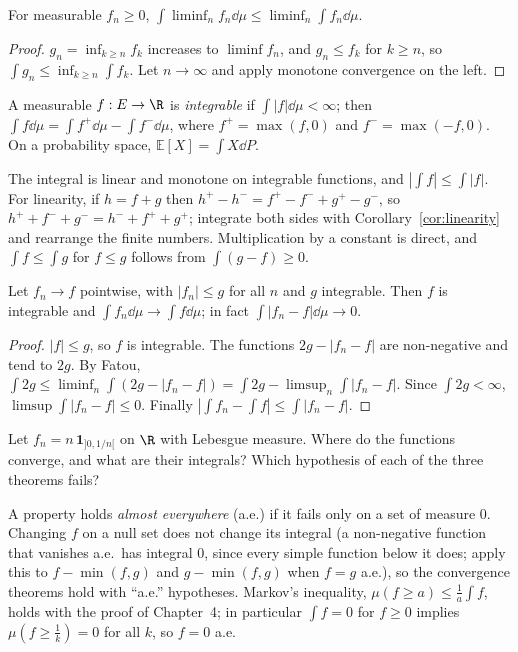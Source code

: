 \begin{theorem}\label{thm:fatou}
For measurable $f_n\ge0$, $\displaystyle\int\liminf_nf_n\dd\mu\le\liminf_n\int f_n\dd\mu$.
\end{theorem}
\begin{proof}
$g_n=\inf_{k\ge n}f_k$ increases to $\liminf f_n$, and $g_n\le f_k$ for $k\ge n$, so $\int g_n\le\inf_{k\ge n}\int f_k$. Let $n\to\infty$ and apply monotone
convergence on the left.
\end{proof}

\begin{definition}
A measurable $f:E\to\R$ is \emph{integrable} if $\int|f|\dd\mu<\infty$; then $\int f\dd\mu=\int f^+\dd\mu-\int f^-\dd\mu$, where $f^+=\max(f,0)$ and
$f^-=\max(-f,0)$. On a probability space, $\mathbb E[X]=\int X\dd P$.
\end{definition}

The integral is linear and monotone on integrable functions, and $|\int f|\le\int|f|$. For linearity, if $h=f+g$ then
$h^+-h^-=f^+-f^-+g^+-g^-$, so $h^++f^-+g^-=h^-+f^++g^+$; integrate both sides with Corollary~\ref{cor:linearity} and rearrange the finite
numbers. Multiplication by a constant is direct, and $\int f\le\int g$ for $f\le g$ follows from $\int(g-f)\ge0$.

\begin{theorem}\label{thm:dct}
Let $f_n\to f$ pointwise, with $|f_n|\le g$ for all $n$ and $g$ integrable. Then $f$ is integrable and $\int f_n\dd\mu\to\int f\dd\mu$; in fact
$\int|f_n-f|\dd\mu\to0$.
\end{theorem}
\begin{proof}
$|f|\le g$, so $f$ is integrable. The functions $2g-|f_n-f|$ are non-negative and tend to $2g$. By Fatou,
$\int2g\le\liminf_n\int(2g-|f_n-f|)=\int2g-\limsup_n\int|f_n-f|$. Since $\int2g<\infty$, $\limsup\int|f_n-f|\le0$. Finally
$|\int f_n-\int f|\le\int|f_n-f|$.
\end{proof}

\begin{think}
Let $f_n=n\,\mathbf 1_{]0,1/n[}$ on $\R$ with Lebesgue measure. Where do the functions converge, and what are their integrals? Which
hypothesis of each of the three theorems fails?
\end{think}

A property holds \emph{almost everywhere} (a.e.) if it fails only on a set of measure $0$. Changing $f$ on a null set does
not change its integral (a non-negative function that vanishes a.e.\ has integral $0$, since every simple function
below it does; apply this to $f-\min(f,g)$ and $g-\min(f,g)$ when $f=g$ a.e.), so the convergence theorems
hold with ``a.e.'' hypotheses. Markov's inequality, $\mu(f\ge a)\le\frac1a\int f$, holds with the proof of Chapter~4; in particular
$\int f=0$ for $f\ge0$ implies $\mu(f\ge\frac1k)=0$ for all $k$, so $f=0$ a.e.


